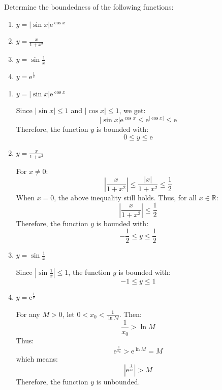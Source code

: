 \begin{exercise}
Determine the boundedness of the following functions:
\begin{enumerate}
    \item \( y = |\sin x| \mathrm{e}^{\cos x} \)
    \item \( y = \frac{x}{1 + x^2} \)
    \item \( y = \sin \frac{1}{x} \)
    \item \( y = \mathrm{e}^{\frac{1}{x}} \)
\end{enumerate}
\end{exercise}
\begin{solution}
\begin{enumerate}
    \item \( y = |\sin x| \mathrm{e}^{\cos x} \)
    
    Since \( |\sin x| \leq 1 \) and \( |\cos x| \leq 1 \), we get:
    \[
    |\sin x| \mathrm{e}^{\cos x} \leq \mathrm{e}^{|\cos x|} \leq \mathrm{e}
    \]
    Therefore, the function \( y \) is bounded with:
    \[
    0 \leq y \leq \mathrm{e}
    \]
    
    \item \( y = \frac{x}{1 + x^2} \)
    
    For \( x \neq 0 \):
    \[
    \left| \frac{x}{1 + x^2} \right| \leq \frac{|x|}{1 + x^2} \leq \frac{1}{2}
    \]
    When \( x = 0 \), the above inequality still holds. Thus, for all \( x \in \mathbb{R} \):
    \[
    \left| \frac{x}{1 + x^2} \right| \leq \frac{1}{2}
    \]
    Therefore, the function \( y \) is bounded with:
    \[
    -\frac{1}{2} \leq y \leq \frac{1}{2}
    \]
    
    \item \( y = \sin \frac{1}{x} \)
    
    Since \( \left| \sin \frac{1}{x} \right| \leq 1 \), the function \( y \) is bounded with:
    \[
    -1 \leq y \leq 1
    \]
    
    \item \( y = \mathrm{e}^{\frac{1}{x}} \)
    
    For any \( M > 0 \), let \( 0 < x_0 < \frac{1}{\ln M} \). Then:
    \[
    \frac{1}{x_0} > \ln M
    \]
    Thus:
    \[
    \mathrm{e}^{\frac{1}{x_0}} > \mathrm{e}^{\ln M} = M
    \]
    which means:
    \[
    \left| \mathrm{e}^{\frac{1}{x_0}} \right| > M
    \]
    Therefore, the function \( y \) is unbounded.
\end{enumerate}
\end{solution}

